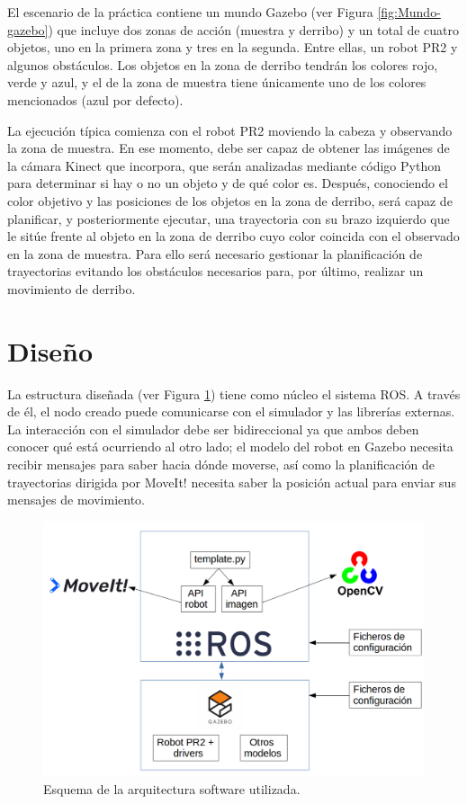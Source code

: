 \documentclass[12pt,spanish,chapterprefix, numbers=noenddot]{book}
\numberwithin{equation}{section}
\numberwithin{figure}{section}
\begin{document}
El escenario de la práctica contiene un mundo Gazebo (ver Figura \ref{fig:Mundo-gazebo}) que incluye dos zonas de acción (muestra y derribo) y un total de cuatro objetos, uno en la primera zona y tres en la segunda. Entre ellas, un robot PR2 y algunos obstáculos. Los objetos en la zona de derribo tendrán los colores rojo, verde y azul, y el de la zona de muestra tiene únicamente uno de los colores mencionados (azul por defecto). 

La ejecución típica comienza con el robot PR2 moviendo la cabeza y observando la zona de muestra. En ese momento, debe ser capaz de obtener las imágenes de la cámara Kinect que incorpora, que serán analizadas mediante código Python para determinar si hay o no un objeto y de qué color es. 
Después, conociendo el color objetivo y las posiciones de los objetos en la zona de derribo, será capaz de planificar, y posteriormente ejecutar, una trayectoria con su brazo izquierdo que le sitúe frente al objeto en la zona de derribo cuyo color coincida con el observado en la zona de muestra. Para ello será necesario gestionar la planificación de trayectorias evitando los obstáculos necesarios para, por último, realizar un movimiento de derribo.

\section{Diseño}
La estructura diseñada (ver Figura \ref{fig:tfg_schema}) tiene como núcleo el sistema ROS. A través de él, el nodo creado puede comunicarse con el simulador y las librerías externas. La interacción con el simulador debe ser bidireccional ya que ambos deben conocer qué está ocurriendo al otro lado; el modelo del robot en Gazebo necesita recibir mensajes para saber hacia dónde moverse, así como la planificación de trayectorias dirigida por MoveIt! necesita saber la posición actual para enviar sus mensajes de movimiento.

\begin{figure}[hbt!]
\centering
\includegraphics[width=12cm]{Figs/tfg_schema.png}
\par
\caption{\label{fig:tfg_schema}Esquema de la arquitectura software utilizada.}
\end{figure}
\end{document}

